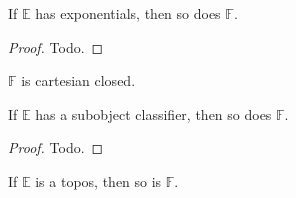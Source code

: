 \documentclass{article}
\newcommand\Psh[1]{\widehat{#1}}
\newcommand\Sh[1]{\mathbf{Sh} (#1)}
\newcommand\AreAdjoint[1]{\FormatList{\IMode}{\dashv}{#1}}
\begin{document}
\begin{lem}
  If $\mathbb{E}$ has exponentials, then so does $\mathbb{F}$.
\end{lem}
\begin{proof}
  Todo.
\end{proof}

\begin{cor}
  $\mathbb{F}$ is cartesian closed.
\end{cor}

\begin{lem}
  If $\mathbb{E}$ has a subobject classifier, then so does
  $\mathbb{F}$.
\end{lem}
\begin{proof}
  Todo.
\end{proof}

\begin{cor}
  If $\mathbb{E}$ is a topos, then so is $\mathbb{F}$.
\end{cor}


\end{document}
